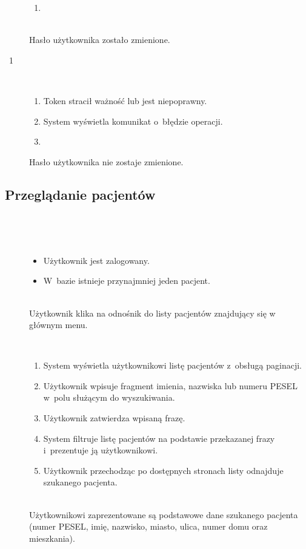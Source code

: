 \documentclass[11pt]{aghdpl}
\begin{document}
\begin{description}
\begin{enumerate}[label=11a\arabic*.]
			\item {}
			\end{enumerate}
		\item[\useCaseWarKonc] \hfill \\ 
			Hasło użytkownika zostało zmienione.
		\item[\useCaseWyjatek~1] \hfill \\
			\begin{enumerate}[label=11b\arabic*.]
			\item Token stracił ważność lub jest niepoprawny.
			\item System wyświetla komunikat o~błędzie operacji.
			\item \useCaseEnd
			\end{enumerate}
			Hasło użytkownika nie zostaje zmienione.
	\end{description}

\subsection{Przeglądanie pacjentów}
	
	\begin{description}
		\item[\useCaseAktor] \hfill \\
			\useCaseUzytkownik
		\item[\useCaseWarPocz] \hfill \\
		\begin{itemize}
			\item Użytkownik jest zalogowany.
			\item W~bazie istnieje przynajmniej jeden pacjent.
		\end{itemize}
			
		\item[\useCaseZdarzInicj] \hfill \\
			Użytkownik klika na odnośnik do listy pacjentów znajdujący się w głównym menu.
		\item[\useCaseScenBaz] \hfill \\ 
			\begin{enumerate}
			\item System wyświetla użytkownikowi listę pacjentów z~obsługą paginacji.
			\item Użytkownik wpisuje fragment imienia, nazwiska lub numeru PESEL w~polu służącym do wyszukiwania.
			\item Użytkownik zatwierdza wpisaną frazę.
			\item System filtruje listę pacjentów na podstawie przekazanej frazy i~prezentuje ją użytkownikowi.
			\item Użytkownik przechodząc po dostępnych stronach listy odnajduje szukanego pacjenta.
			\end{enumerate}
		\item[\useCaseWarKonc] \hfill \\ 
			Użytkownikowi zaprezentowane są podstawowe dane szukanego pacjenta (numer PESEL, imię, nazwisko, miasto, ulica, numer domu oraz mieszkania).
	\end{description}
\end{document}
